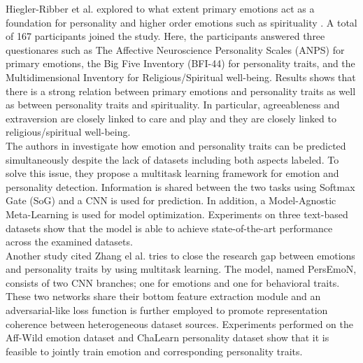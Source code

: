 Hiegler-Ribber et al. \cite{personality_emotions_link} explored to what extent primary emotions act as a foundation for personality and higher order emotions such as spirituality \cite{HP_RPP}. A total of 167 participants joined the study. Here, the participants answered three questionares such as The Affective Neuroscience Personality Scales (ANPS) for primary emotions, the Big Five Inventory (BFI-44) for personality traits, and the Multidimensional Inventory for Religious/Spiritual well-being. Results shows that there is a strong relation between primary emotions and personality traits as well as between personality traits and spirituality. In particular, agreeableness and extraversion are closely linked to care and play and they are closely linked to religious/spiritual well-being. \\ 

The authors in \cite{personality-emotion1-LI2022340} investigate how emotion and personality traits can be predicted simultaneously despite the lack of datasets including both aspects labeled. To solve this issue, they propose a multitask learning framework for emotion and personality detection. Information is shared between the two tasks using Softmax Gate (SoG) and a CNN is used for prediction. In addition, a Model-Agnostic Meta-Learning is used for model optimization. Experiments on three text-based datasets show that the model is able to achieve state-of-the-art performance across the examined datasets. \\

Another study cited Zhang el al. \cite{personality-emotion2-8897617} tries to close the research gap between emotions and personality traits by using multitask learning. The model, named PersEmoN, consists of two CNN branches; one for emotions and one for behavioral traits. These two networks share their bottom feature extraction module and an adversarial-like loss function is further employed to promote representation coherence between heterogeneous dataset sources. Experiments performed on the Aff-Wild emotion dataset and ChaLearn personality dataset show that it is feasible to jointly train emotion and corresponding personality traits. 

